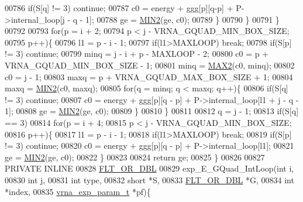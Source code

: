 \begin{DoxyCode}
00786         \textcolor{keywordflow}{if}(S[q] != 3) \textcolor{keywordflow}{continue};
00787         c0  = energy + ggg[p][q-p] + P->internal\_loop[j - q - 1];
00788         ge  = \hyperlink{group__utils_ga2dd4a927a7f937f43a90c144d79107d8}{MIN2}(ge, c0);
00789       \}
00790     \}
00791   \}
00792 
00793   \textcolor{keywordflow}{for}(p = i + 2;
00794       p < j - VRNA\_GQUAD\_MIN\_BOX\_SIZE;
00795       p++)\{
00796     l1    = p - i - 1;
00797     \textcolor{keywordflow}{if}(l1>MAXLOOP) \textcolor{keywordflow}{break};
00798     \textcolor{keywordflow}{if}(S[p] != 3) \textcolor{keywordflow}{continue};
00799     minq  = j - i + p - MAXLOOP - 2;
00800     c0    = p + VRNA\_GQUAD\_MIN\_BOX\_SIZE - 1;
00801     minq  = \hyperlink{group__utils_gadd91367918fadbc8d585940d6206d6d2}{MAX2}(c0, minq);
00802     c0    = j - 1;
00803     maxq  = p + VRNA\_GQUAD\_MAX\_BOX\_SIZE + 1;
00804     maxq  = \hyperlink{group__utils_ga2dd4a927a7f937f43a90c144d79107d8}{MIN2}(c0, maxq);
00805     \textcolor{keywordflow}{for}(q = minq; q < maxq; q++)\{
00806       \textcolor{keywordflow}{if}(S[q] != 3) \textcolor{keywordflow}{continue};
00807       c0  = energy + ggg[p][q - p] + P->internal\_loop[l1 + j - q - 1];
00808       ge   = \hyperlink{group__utils_ga2dd4a927a7f937f43a90c144d79107d8}{MIN2}(ge, c0);
00809     \}
00810   \}
00811 
00812   q = j - 1;
00813   \textcolor{keywordflow}{if}(S[q] == 3)
00814     \textcolor{keywordflow}{for}(p = i + 4;
00815         p < j - VRNA\_GQUAD\_MIN\_BOX\_SIZE;
00816         p++)\{
00817       l1    = p - i - 1;
00818       \textcolor{keywordflow}{if}(l1>MAXLOOP) \textcolor{keywordflow}{break};
00819       \textcolor{keywordflow}{if}(S[p] != 3) \textcolor{keywordflow}{continue};
00820       c0  = energy + ggg[p][q - p] + P->internal\_loop[l1];
00821       ge  = \hyperlink{group__utils_ga2dd4a927a7f937f43a90c144d79107d8}{MIN2}(ge, c0);
00822     \}
00823 
00824   \textcolor{keywordflow}{return} ge;
00825 \}
00826 
00827 PRIVATE INLINE
00828 \hyperlink{group__data__structures_ga31125aeace516926bf7f251f759b6126}{FLT\_OR\_DBL}
00829 exp\_E\_GQuad\_IntLoop(\textcolor{keywordtype}{int} i,
00830                     \textcolor{keywordtype}{int} j,
00831                     \textcolor{keywordtype}{int} type,
00832                     \textcolor{keywordtype}{short} *S,
00833                     \hyperlink{group__data__structures_ga31125aeace516926bf7f251f759b6126}{FLT\_OR\_DBL} *G,
00834                     \textcolor{keywordtype}{int} *index,
00835                     \hyperlink{group__energy__parameters_structvrna__exp__param__s}{vrna\_exp\_param\_t} *pf)\{

\end{DoxyCode}

